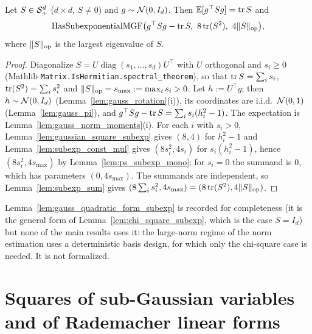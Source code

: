 \begin{lemma}\label{lem:gauss_quadratic_form_subexp}
Let $S \in \mathcal{S}_{+}^{d}$ ($d\times d$, $S \ne 0$) and $g \sim \mathcal{N}(0,I_d)$. Then
$\mathbb{E}[g^\top Sg] = \operatorname{tr} S$ and
\[
  \mathrm{HasSubexponentialMGF}\big(g^\top Sg - \operatorname{tr} S,\ 8\operatorname{tr}(S^2),\ 4\lVert S \rVert_{\mathrm{op}}\big),
\]
where $\lVert S \rVert_{\mathrm{op}}$ is the largest eigenvalue of $S$.
\end{lemma}

\begin{proof}
Diagonalize $S = U\operatorname{diag}(s_1,\dots,s_d)U^\top$ with $U$ orthogonal and
$s_i \ge 0$ (Mathlib \texttt{Matrix.IsHermitian.spectral\_theorem}), so that
$\operatorname{tr} S = \sum_is_i$, $\operatorname{tr}(S^2) = \sum_is_i^2$ and $\lVert S \rVert_{\mathrm{op}} = s_{\max} := \max_is_i > 0$.
Let $h := U^\top g$; then $h \sim \mathcal{N}(0,I_d)$ (Lemma~\ref{lem:gauss_rotation}(i)), its
coordinates are i.i.d.\ $\mathcal{N}(0,1)$ (Lemma~\ref{lem:gauss_pi}), and
$g^\top Sg - \operatorname{tr} S = \sum_is_i(h_i^2 - 1)$. The expectation is
Lemma~\ref{lem:gauss_norm_moments}(i). For each $i$ with $s_i > 0$,
Lemma~\ref{lem:gaussian_square_subexp} gives $(8,4)$ for $h_i^2 - 1$ and
Lemma~\ref{lem:subexp_const_mul} gives $(8s_i^2, 4s_i)$ for $s_i(h_i^2-1)$, hence
$(8s_i^2, 4s_{\max})$ by Lemma~\ref{lem:ps_subexp_mono}; for $s_i = 0$ the summand is $0$,
which has parameters $(0, 4s_{\max})$. The summands are independent, so
Lemma~\ref{lem:subexp_sum} gives $(8\sum_is_i^2, 4s_{\max}) = (8\operatorname{tr}(S^2), 4\lVert S \rVert_{\mathrm{op}})$.
\end{proof}

\begin{remark}\label{rem:ps_quadratic_form_unused}
Lemma~\ref{lem:gauss_quadratic_form_subexp} is recorded for completeness (it is the general
form of Lemma~\ref{lem:chi_square_subexp}, which is the case $S = I_d$) but none of the main
results uses it: the large-norm regime of the norm estimation uses a deterministic basis
design, for which only the chi-square case is needed. It is not formalized.
\end{remark}

\section{Squares of sub-Gaussian variables and of Rademacher linear forms}
\label{sec:pre_subexp_rademacher}

